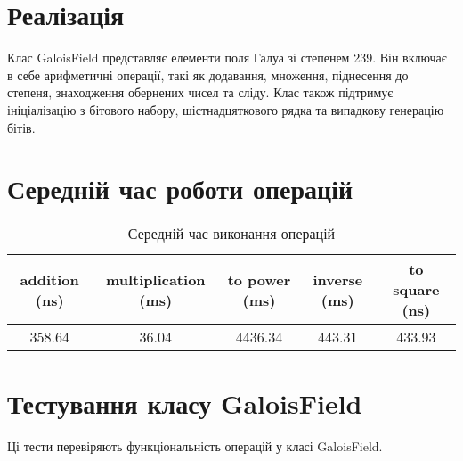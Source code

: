 \documentclass{article}
\begin{document}
\newpage
\section{Реалізація}
\quad Клас GaloisField представляє елементи поля Галуа зі степенем 239. Він включає в себе арифметичні операції, такі як додавання, множення, піднесення до степеня, знаходження обернених чисел та сліду. Клас також підтримує ініціалізацію з бітового набору, шістнадцяткового рядка та випадкову генерацію бітів.

\section{Середній час роботи операцій}
\quad
\begin{table}[h]
\centering
\begin{tabular}{|c|c|c|c|c|}
\hline
\textbf{addition (ns)} & \textbf{multiplication (ms)} & \textbf{to power (ms)} & \textbf{inverse (ms)} & \textbf{to square (ns)}\\
\hline
358.64 & 36.04 & 4436.34 & 443.31 & 433.93\\
\hline
\end{tabular}
\caption{Середній час виконання операцій}
\label{tab:comparison}
\end{table}

\section{Тестування класу GaloisField}

Ці тести перевіряють функціональність операцій у класі GaloisField.
\end{document}
